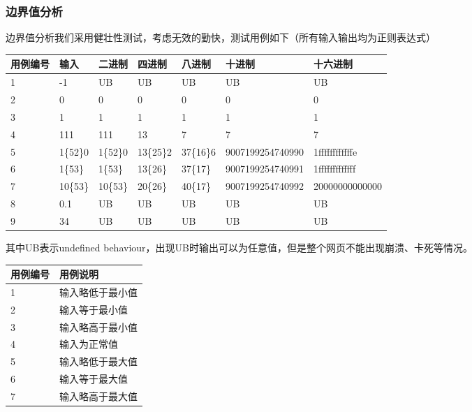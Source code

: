 \documentclass[12pt, a4paper, oneside]{ctexart}
\begin{document}
\subsubsection{边界值分析}
边界值分析我们采用健壮性测试，考虑无效的勤快，测试用例如下（所有输入输出均为正则表达式）
\begin{table}[!h]
    \begin{tabular}{|l|l|l|l|l|l|l|}
    \hline
    用例编号 & 输入 & 二进制 & 四进制 & 八进制 & 十进制 & 十六进制 \\ \hline
    1 & -1 & UB & UB & UB & UB & UB \\ \hline
    2 & 0 & 0 & 0 & 0 & 0 & 0 \\ \hline
    3 & 1 & 1 & 1 & 1 & 1 & 1\\ \hline
    4 & 111 & 111 & 13 & 7 & 7 & 7 \\ \hline
    5 & 1\{52\}0 & 1\{52\}0 & 13\{25\}2 & 37\{16\}6 & 9007199254740990 & 1ffffffffffffe \\ \hline
    6 & 1\{53\} & 1\{53\} & 13\{26\} & 37\{17\} & 9007199254740991 & 1fffffffffffff \\ \hline
    7 & 10\{53\} & 10\{53\} & 20\{26\} & 40\{17\} & 9007199254740992 & 20000000000000 \\ \hline
    8 & 0.1 & UB & UB & UB & UB & UB \\ \hline
    9 & 34 & UB & UB & UB & UB & UB\\ \hline
    \end{tabular}
\end{table}
其中UB表示undefined behaviour，出现UB时输出可以为任意值，但是整个网页不能出现崩溃、卡死等情况。

\begin{table}[!h]
    \begin{tabular}{|l|l|}
    \hline
    用例编号 & 用例说明\\ \hline
    1 & 输入略低于最小值\\ \hline
    2 & 输入等于最小值 \\ \hline
    3 & 输入略高于最小值 \\ \hline
    4 & 输入为正常值 \\ \hline
    5 & 输入略低于最大值 \\ \hline
    6 & 输入等于最大值 \\ \hline
    7 & 输入略高于最大值 \\ \hline
        
    \end{tabular}
\end{table}
\end{document}

